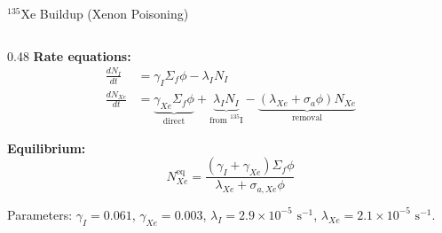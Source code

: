\documentclass[aspectratio=169]{beamer} %
\begin{document}
\begin{frame}{ $^{135}$Xe Buildup (Xenon Poisoning)}
\begin{columns}[T]
        \begin{column}{0.48\textwidth}
            \textbf{Rate equations:}
            \vspace{-0.2cm}
            \begin{align*}
                \frac{dN_I}{dt} &= \gamma_I \Sigma_f \phi - \lambda_I N_I \\[0.1cm]
                \frac{dN_{Xe}}{dt} &= \underbrace{\gamma_{Xe} \Sigma_f \phi}_{\text{direct}} + \underbrace{\lambda_I N_I}_{\text{from }^{135}\text{I}} - \underbrace{(\lambda_{Xe} + \sigma_a \phi) N_{Xe}}_{\text{removal}}
            \end{align*}
            
            \vspace{0.1cm}
            \textbf{Equilibrium:}
            \vspace{-0.1cm}
            \begin{equation*}
                N_{Xe}^{\text{eq}} = \frac{(\gamma_I + \gamma_{Xe}) \Sigma_f \phi}{\lambda_{Xe} + \sigma_{a,Xe} \phi}
            \end{equation*}
            
            \vspace{0.1cm}
            \begin{tcolorbox}[colframe=orange, colback=orange!5, boxrule=0.5pt, arc=2pt, left=1mm, right=1mm, top=1mm, bottom=1mm]
                \scriptsize Parameters: $\gamma_I = 0.061$, $\gamma_{Xe} = 0.003$, $\lambda_I = 2.9 \times 10^{-5} \text{ s}^{-1}$, $\lambda_{Xe} = 2.1 \times 10^{-5} \text{ s}^{-1}$.
            \end{tcolorbox}
        \end{column}
        
    \end{columns}
    
\end{frame}
\end{document}
